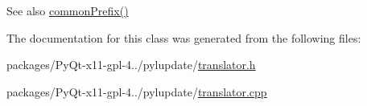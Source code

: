 \begin{DoxySeeAlso}{See also}
\hyperlink{classTranslatorMessage_a9c4cfd4e220bd694740927a62e11275e}{common\+Prefix()} 
\end{DoxySeeAlso}


The documentation for this class was generated from the following files\+:\begin{DoxyCompactItemize}
\item 
packages/\+Py\+Qt-\/x11-\/gpl-\/4../pylupdate/\hyperlink{translator_8h}{translator.\+h}\item 
packages/\+Py\+Qt-\/x11-\/gpl-\/4../pylupdate/\hyperlink{translator_8cpp}{translator.\+cpp}\end{DoxyCompactItemize}
